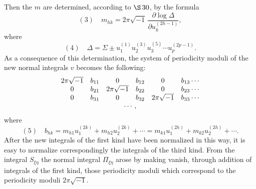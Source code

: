 \documentclass[10pt]{article}
\begin{document}
Then the \(m\) are determined, according to \(\S\,30\), by the formula
\[
(3)\quad
m_{hk}=2\pi\sqrt{-1}\,\frac{\partial\log\Delta}{\partial u_k^{(2h-1)}},
\]
where
\[
(4)\quad
\Delta=\Sigma\pm u_1^{(1)}u_2^{(3)}u_3^{(5)}\cdots u_p^{(2p-1)}.
\]
As a consequence of this determination, the system of periodicity moduli of the new normal integrals \(v\) becomes the following:
\[
\begin{array}{cccccc}
2\pi\sqrt{-1}&b_{11}&0&b_{12}&0&b_{13}\cdots\\
0&b_{21}&2\pi\sqrt{-1}&b_{22}&0&b_{23}\cdots\\
0&b_{31}&0&b_{32}&2\pi\sqrt{-1}&b_{33}\cdots\\
\multicolumn{6}{c}{\cdots,}
\end{array}
\]
where
\[
(5)\quad
b_{hk}=m_{h1}u_1^{(2k)}+m_{h2}u_2^{(2k)}+\cdots
=m_{k1}u_1^{(2h)}+m_{k2}u_2^{(2h)}+\cdots.
\]
After the new integrals of the first kind have been normalized in this way, it is easy to normalize correspondingly the integrals of the third kind. From the integral \(S_{\xi\eta}\) the normal integral \(\Pi_{\xi\eta}\) arose by making vanish, through addition of integrals of the first kind, those periodicity moduli which correspond to the periodicity moduli \(2\pi\sqrt{-1}\).

\end{document}
